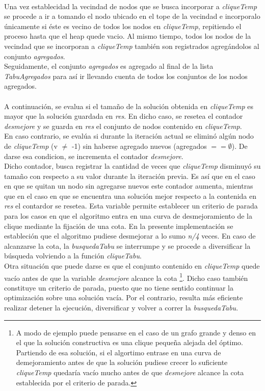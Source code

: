 \paragraph{}
Una vez establecidad la vecindad de nodos que se busca incorporar a \textit{cliqueTemp} se procede a ir a tomando el nodo ubicado en el tope de la vecindad e incorporalo únicamente si éste es vecino de todos los nodos en \textit{cliqueTemp}, repitiendo el proceso hasta que el heap quede vacio. Al mismo tiempo, todos los nodos de la vecindad que se incorporan a \textit{cliqueTemp} también son registrados agregándolos al conjunto \textit{agregados}. \\
Seguidamente, el conjunto \textit{agregados} es agregado al final de la lista \textit{TabuAgregados} para así ir llevando cuenta de todos los conjuntos de los nodos agregados.

\paragraph{}
A continuación, se evalua si el tamaño de la solución obtenida en \textit{cliqueTemp} es mayor que la solución guardada en \textit{res}. En dicho caso, se resetea el contador \textit{desmejore} y se guarda en \textit{res} el conjunto de nodos contenido en \textit{cliqueTemp}. \\
En caso contrario, se evalúa si durante la iteración actual se eliminó algún nodo de \textit{cliqueTemp} (v $\neq$ -1) sin haberse agregado nuevos (agregados $== \emptyset$). De darse esa condicion, se incrementa el contador \textit{desmejore}. \\
Dicho contador, busca registrar la cantidad de veces que \textit{cliqueTemp} disminuyó su tamaño con respecto a su valor durante la iteración previa. Es así que en el caso en que se quitan un nodo sin agregarse nuevos este contador aumenta, mientras que en el caso en que se encuentra una solución mejor respecto a la contenida en \textit{res} el contardor se resetea. Esta variable permite establecer un criterio de parada para los casos en que el algoritmo entra en una curva de desmejoramiento de la clique mediante la fijación de una cota. En la presente implementación se estableción que el algoritmo pudiese desmejorar a lo sumo \textit{n/4} veces. En caso de alcanzarse la cota, la \textit{busquedaTabu} se interrumpe y se procede a diversificar la búsqueda volviendo a la función \textit{cliqueTabu}. \\
Otra situación que puede darse es que el conjunto contenido en \textit{cliqueTemp} quede vacío antes de que la variable \textit{desmejore} alcance la cota \footnote{A modo de ejemplo puede pensarse en el caso de un grafo grande y denso en el que la solución constructiva es una clique pequeña alejada del óptimo. Partiendo de esa solución, si el algortimo entrase en una curva de demejoramiento antes de que la solución pudiese crecer lo suficiente \textit{cliqueTemp} quedaría vacío mucho antes de que \textit{desmejore} alcance la cota establecida por el criterio de parada.}. Dicho caso también constituye un criterio de parada, puesto que no tiene sentido continuar la optimización sobre una solución vacía. Por el contrario, resulta más eficiente realizar detener la ejecución, diversificar y volver a correr la \textit{busquedaTabu}.

